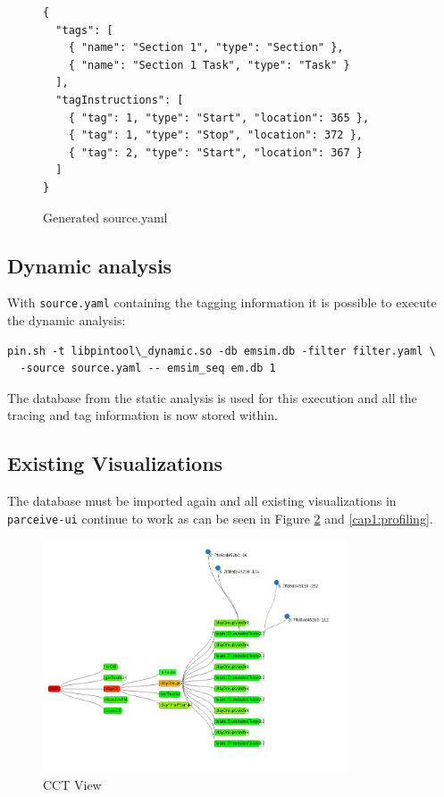 \begin{figure}
	\begin{center}
		\begin{verbatim}
{
  "tags": [
    { "name": "Section 1", "type": "Section" },
    { "name": "Section 1 Task", "type": "Task" }
  ],
  "tagInstructions": [
    { "tag": 1, "type": "Start", "location": 365 },
    { "tag": 1, "type": "Stop", "location": 372 },
    { "tag": 2, "type": "Start", "location": 367 }
  ]
}
		\end{verbatim}
	\end{center}
	\caption{Generated source.yaml}
	\label{cap1:source}
\end{figure}

\subsection {Dynamic analysis}

With \texttt{source.yaml} containing the tagging information it is possible to execute the dynamic analysis:

\begin{lstlisting}[style=BashInputStyle]
pin.sh -t libpintool\_dynamic.so -db emsim.db -filter filter.yaml \ 
  -source source.yaml -- emsim_seq em.db 1
\end{lstlisting}

The database from the static analysis is used for this execution and all the tracing and tag information is now stored within.

\subsection {Existing Visualizations}

The database must be imported again and all existing visualizations in \texttt{parceive-ui} continue to work as can be seen in Figure \ref{cap1:cct} and \ref{cap1:profiling}.

\begin{figure}[!ht]
	\centering
	\includegraphics[width=0.8\textwidth]{cct}
	\caption{CCT View}
	\label{cap1:cct}
\end{figure}

